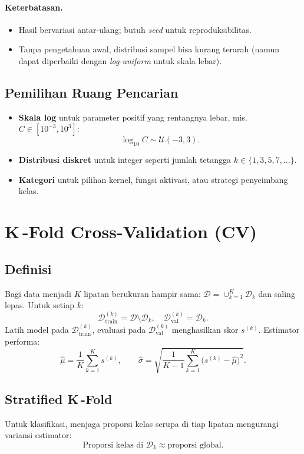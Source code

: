 \documentclass[11pt,a4paper]{article}
\begin{document}
\paragraph{Keterbatasan.}
\begin{itemize}[leftmargin=1.2em]
  \item Hasil bervariasi antar-ulang; butuh \emph{seed} untuk reproduksibilitas.
  \item Tanpa pengetahuan awal, distribusi sampel bisa kurang terarah (namun dapat diperbaiki dengan \emph{log-uniform} untuk skala lebar).
\end{itemize}

\subsection{Pemilihan Ruang Pencarian}
\begin{itemize}[leftmargin=1.2em]
  \item \textbf{Skala log} untuk parameter positif yang rentangnya lebar, mis.\ $C\in[10^{-3},10^{3}]$:
  \[
  \log_{10} C \sim \mathcal{U}(-3, 3).
  \]
  \item \textbf{Distribusi diskret} untuk integer seperti jumlah tetangga $k\in\{1,3,5,7,\dots\}$.
  \item \textbf{Kategori} untuk pilihan kernel, fungsi aktivasi, atau strategi penyeimbang kelas.
\end{itemize}

\section{K\,-Fold Cross-Validation (CV)}
\subsection{Definisi}
Bagi data menjadi $K$ lipatan berukuran hampir sama: $\mathcal{D} = \cup_{k=1}^K \mathcal{D}_k$ dan saling lepas. Untuk setiap $k$:
\[
\mathcal{D}_{\text{train}}^{(k)} = \mathcal{D}\setminus \mathcal{D}_k,\quad
\mathcal{D}_{\text{val}}^{(k)} = \mathcal{D}_k.
\]
Latih model pada $\mathcal{D}_{\text{train}}^{(k)}$, evaluasi pada $\mathcal{D}_{\text{val}}^{(k)}$ menghasilkan skor $s^{(k)}$. Estimator performa:
\[
\hat{\mu} = \frac{1}{K}\sum_{k=1}^{K} s^{(k)},\qquad
\hat{\sigma} = \sqrt{\frac{1}{K-1}\sum_{k=1}^{K}\big(s^{(k)}-\hat{\mu}\big)^2}.
\]

\subsection{Stratified K\,-Fold}
Untuk klasifikasi, menjaga proporsi kelas serupa di tiap lipatan mengurangi variansi estimator:
\[
\text{Proporsi kelas di } \mathcal{D}_k \approx \text{proporsi global}.
\]
\end{document}
